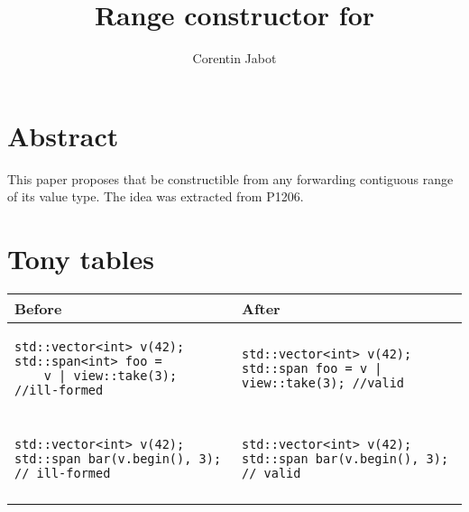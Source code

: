 \documentclass{wg21}
\title{Range constructor for \tcode{std::span}}
\author{Corentin Jabot}{corentin.jabot@gmail.com}
\begin{document}
\maketitle

\section{Abstract}

This paper proposes that  be constructible from any forwarding contiguous range of its value type.
The idea was extracted from P1206.

\section{Tony tables}
\begin{center}
\begin{tabular}{l|l}
Before & After\\ \hline

\begin{minipage}[t]{0.5\textwidth}
\begin{verbatim}
std::vector<int> v(42);
std::span<int> foo = 
    v | view::take(3); //ill-formed
\end{verbatim}
\end{minipage}
&
\begin{minipage}[t]{0.5\textwidth}
\begin{verbatim}
std::vector<int> v(42);
std::span foo = v | view::take(3); //valid
\end{verbatim}
\end{minipage}
\\\\ \hline


\begin{minipage}[t]{0.5\textwidth}
\begin{verbatim}
std::vector<int> v(42);
std::span bar(v.begin(), 3); // ill-formed
\end{verbatim}
\end{minipage}
&
\begin{minipage}[t]{0.5\textwidth}
\begin{verbatim}
std::vector<int> v(42);
std::span bar(v.begin(), 3); // valid

\end{verbatim}
\end{minipage}
\\\\ \hline


\end{tabular}
\end{center}
\end{document}
